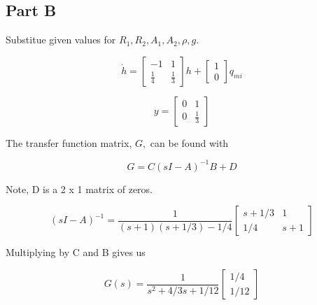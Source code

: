 \documentclass[12pt]{article}
\numberwithin{equation}{subsection}
\newcommand\ddfrac[2]{\frac{\displaystyle #1}{\displaystyle #2}}
\begin{document}
  \subsection{Part B}

  Substitue given values for $ R_1, R_2, A_1, A_2, \rho, g. $

  \begin{equation}
    \dot h =
    \begin{bmatrix}
      -1 & 1 \\
      \ddfrac{1}{4} & \ddfrac{1}{3}
    \end{bmatrix} h +
    \begin{bmatrix}
      1 \\ 0
    \end{bmatrix} q_{mi}
  \end{equation}

  \begin{equation}
    y =
    \begin{bmatrix}
      0 & 1 \\
      0 & \ddfrac{1}{3}
    \end{bmatrix}
  \end{equation}

  The transfer function matrix, $ G, $ can be found with

  \begin{equation}
    G = C(sI - A)^{-1}B + D
  \end{equation}

  Note, D is a 2 x 1 matrix of zeros.

  \begin{equation}
    (sI - A)^{-1} = \frac{1}{(s + 1)(s + 1/3) - 1/4}
    \begin{bmatrix}
      s + 1/3 & 1 \\
      1/4 & s + 1
    \end{bmatrix}
  \end{equation}

  Multiplying by C and B gives us

  \begin{equation}
    G(s) = \frac{1}{s ^2 + 4/3s + 1/12}
    \begin{bmatrix}
      1/4 \\ 1/12
    \end{bmatrix}
  \end{equation}
\end{document}
